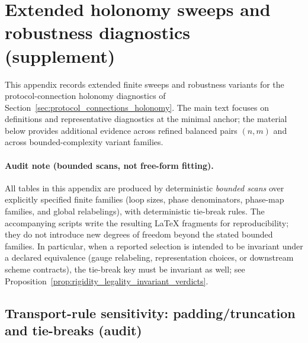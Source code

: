 \section[Extended holonomy sweeps]{Extended holonomy sweeps and robustness diagnostics (supplement)}
\label{app:holonomy_sweeps_extended}

This appendix records extended finite sweeps and robustness variants for the protocol-connection holonomy diagnostics of Section~\ref{sec:protocol_connections_holonomy}.
The main text focuses on definitions and representative diagnostics at the minimal anchor; the material below provides additional evidence across refined balanced pairs $(n,m)$ and across bounded-complexity variant families.

\paragraph{Audit note (bounded scans, not free-form fitting).}
All tables in this appendix are produced by deterministic \emph{bounded scans} over explicitly specified finite families (loop sizes, phase denominators, phase-map families, and global relabelings), with deterministic tie-break rules.
The accompanying scripts write the resulting \LaTeX{} fragments for reproducibility; they do not introduce new degrees of freedom beyond the stated bounded families.
\AuditTag In particular, when a reported selection is intended to be invariant under a declared equivalence (gauge relabeling, representation choices, or downstream scheme contracts), the tie-break key must be invariant as well; see Proposition~\ref{prop:rigidity_legality_invariant_verdicts}.

\subsection{Transport-rule sensitivity: padding/truncation and tie-breaks (audit)}
\label{subsec:holonomy_transport_rule_sensitivity}

